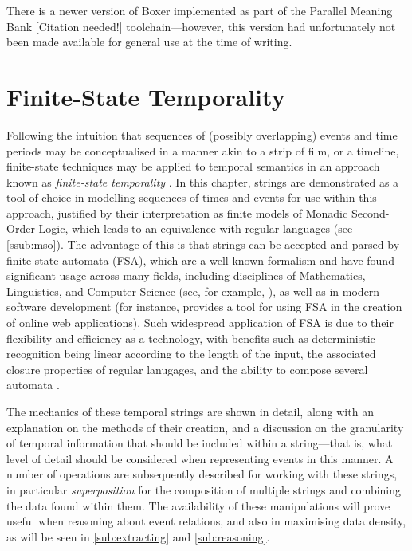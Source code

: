 \documentclass[a4paper,12pt,leqno]{article}
\newcommand{\citeneeded}[1][]{{\color{red}[Citation needed!#1]}}
\begin{document}
There is a newer version of Boxer implemented as part of the Parallel Meaning Bank \citeneeded{} toolchain---however, this version had unfortunately not been made available for general use at the time of writing.

\newpage
\section{Finite-State Temporality}\label{sec:fst}
Following the intuition that sequences of (possibly overlapping) events and time periods may be conceptualised in a manner akin to a strip of film, or a timeline, finite-state techniques may be applied to temporal semantics in an approach known as \textit{finite-state temporality} \citep{fernando2005entailments}. In this chapter, strings are demonstrated as a tool of choice in modelling sequences of times and events for use within this approach, justified by their interpretation as finite models of Monadic Second-Order Logic, which leads to an equivalence with regular languages (see \cref{ssub:mso}). The advantage of this is that strings can be accepted and parsed by finite-state automata (FSA), which are a well-known formalism and have found significant usage across many fields, including disciplines of Mathematics, Linguistics, and Computer Science (see, for example, \citet{buchner1993finite,veanes2012symbolic}), as well as in modern software development (for instance, \citet{khourshid_2015} provides a tool for using FSA in the creation of online web applications). Such widespread application of FSA is due to their flexibility and efficiency as a technology, with benefits such as deterministic recognition being linear according to the length of the input, the associated closure properties of regular lanugages, and the ability to compose several automata \citep{wintner2007finite}.

The mechanics of these temporal strings are shown in detail, along with an explanation on the methods of their creation, and a discussion on the granularity of temporal information that should be included within a string---that is, what level of detail should be considered when representing events in this manner. A number of operations are subsequently described for working with these strings, in particular \textit{superposition} for the composition of multiple strings and combining the data found within them. The availability of these manipulations will prove useful when reasoning about event relations, and also in maximising data density, as will be seen in \cref{sub:extracting} and \cref{sub:reasoning}.
\end{document}
